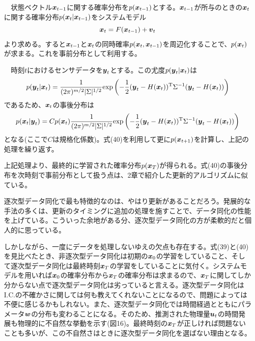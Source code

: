 \documentclass[dvipdfmx, 9pt, a4paper]{jsarticle}
\newcommand{\bm}[1]{{\mbox{\boldmath $#1$}}}
\begin{document}
\begin{tcolorbox}[title=逐次型データ同化]
　状態ベクトル$\bm x_{t-1}$に関する確率分布を$p(\bm x_{t-1})$とする。$\bm x_{t-1}$が所与のときの$\bm x_t$に関する確率分布$p(\bm x_t|\bm x_{t-1})$をシステムモデル
\begin{equation}
\bm x_t=F(\bm x_{t-1})+\bm v_t \notag
\end{equation}
より求める。すると$\bm x_{t-1}$と$\bm x_t$の同時確率$p(\bm x_t, \bm x_{t-1})$を周辺化することで、$p(\bm x_t)$が求まる。これを事前分布として利用する。\par
　時刻$t$におけるセンサデータを$\bm y_t$とする。この尤度$p(\bm y_t|\bm x_t)$は
\begin{equation}
p(\bm y_t|\bm x_t)=\frac{1}{(2\pi)^{m/2}|\Sigma|^{1/2}}{\rm exp}\left(
-\frac{1}{2}(\bm y_t-H(\bm x_t))^{\rm T}\Sigma^{-1}(\bm y_t-H(\bm x_t))
\right) \notag
\end{equation}
であるため、$\bm x_t$の事後分布は
\begin{equation}
p(\bm x_t|\bm y_t)=Cp(\bm x_t)\frac{1}{(2\pi)^{m/2}|\Sigma|^{1/2}}{\rm exp}\left(
-\frac{1}{2}(\bm y_t-H(\bm x_t))^{\rm T}\Sigma^{-1}(\bm y_t-H(\bm x_t))
\right)
\end{equation}
となる(ここで$C$は規格化係数)。式(40)を利用して更に$p(\bm x_{t+1})$を計算し、上記の処理を繰り返す。
\end{tcolorbox}
上記処理より、最終的に学習された確率分布$p(\bm x_T)$が得られる。式(40)の事後分布を次時刻で事前分布として扱う点は、2章で紹介した更新的アルゴリズムに似ている。\par
逐次型データ同化で最も特徴的なのは、やはり更新があることだろう。発展的な手法の多くは、更新のタイミングに追加の処理を施すことで、データ同化の性能を上げている。こういった余地がある分、逐次型データ同化の方が柔軟的だと個人的に思っている。\par
しかしながら、一度にデータを処理しないゆえの欠点も存在する。式(39)と(40)を見比べたとき、非逐次型データ同化は初期の$\bm x_0$の学習をしていること、そして逐次型データ同化は最終時刻$\bm x_T$の学習をしていることに気付く。システムモデルを用いれば$\bm x_0$の確率分布から$\bm x_T$の確率分布は求まるので、$\bm x_T$に関してしか分からない点で逐次型データ同化は劣っていると言える。逐次型データ同化はI.C.の不確かさに関しては何も教えてくれないことになるので、問題によっては不便に感じるかもしれない。また、逐次型データ同化では時間経過とともにパラメータ$\bm w$の分布も変わることになる。そのため、推測された物理量$\bm u_t$の時間発展も物理的に不自然な挙動を示す(図16)。最終時刻の$\bm x_T$が正しければ問題ないことも多いが、この不自然さはときに逐次型データ同化を選ばない理由となる。
\end{document}
